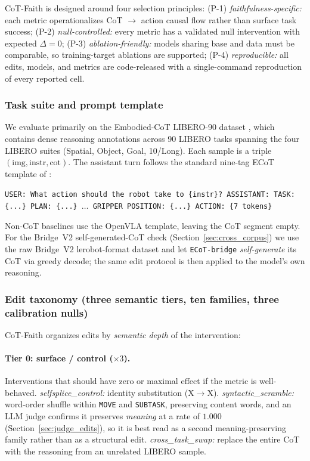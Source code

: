 CoT-Faith is designed around four selection principles: (P-1) \emph{faithfulness-specific:} each metric operationalizes CoT $\to$ action causal flow rather than surface task success; (P-2) \emph{null-controlled:} every metric has a validated null intervention with expected $\Delta\!=\!0$; (P-3) \emph{ablation-friendly:} models sharing base and data must be comparable, so training-target ablations are supported; (P-4) \emph{reproducible:} all edits, models, and metrics are code-released with a single-command reproduction of every reported cell.

\subsubsection{Task suite and prompt template}

We evaluate primarily on the Embodied-CoT LIBERO-90 dataset \citep{ecotlite}, which contains dense reasoning annotations across 90 LIBERO tasks spanning the four LIBERO suites (Spatial, Object, Goal, 10/Long). Each sample is a triple $(\text{img}, \text{instr}, \text{cot})$. The assistant turn follows the standard nine-tag ECoT template of \citet{ecot}:
\begin{center}\small
\texttt{USER: What action should the robot take to \{\allowbreak{}instr\}? ASSISTANT: TASK: \{\allowbreak{}...\} PLAN: \{\allowbreak{}...\} $\ldots$ GRIPPER POSITION: \{\allowbreak{}...\} ACTION: \{\allowbreak{}7 tokens\}}
\end{center}
Non-CoT baselines use the OpenVLA template, leaving the CoT segment empty. For the Bridge~V2 self-generated-CoT check (Section~\ref{sec:cross_corpus}) we use the raw Bridge~V2 lerobot-format dataset and let \texttt{ECoT-bridge} \emph{self-generate} its CoT via greedy decode; the same edit protocol is then applied to the model's own reasoning.

\subsubsection{Edit taxonomy (three semantic tiers, ten families, three calibration nulls)}
\label{sec:taxonomy}

CoT-Faith organizes edits by \emph{semantic depth} of the intervention:

\paragraph{Tier 0: surface / control ($\times 3$).} Interventions that should have zero or maximal effect if the metric is well-behaved.
\emph{selfsplice\_control:} identity substitution (X$\to$X). \emph{syntactic\_scramble:} word-order shuffle within \texttt{MOVE} and \texttt{SUBTASK}, preserving content words, and an LLM judge confirms it preserves \emph{meaning} at a rate of $1.000$ (Section~\ref{sec:judge_edits}), so it is best read as a second meaning-preserving family rather than as a structural edit. \emph{cross\_task\_swap:} replace the entire CoT with the reasoning from an unrelated LIBERO sample.

